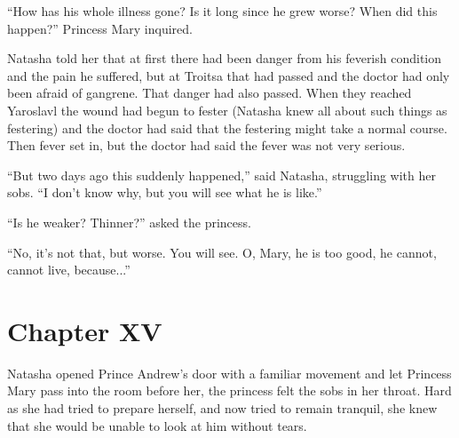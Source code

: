 ``How has his whole illness gone? Is it long since he grew worse?
When did this happen?'' Princess Mary inquired.

Natasha told her that at first there had been danger from his
feverish condition and the pain he suffered, but at Troitsa that
had passed and the doctor had only been afraid of gangrene. That
danger had also passed. When they reached Yaroslavl the wound had
begun to fester (Natasha knew all about such things as festering)
and the doctor had said that the festering might take a normal
course. Then fever set in, but the doctor had said the fever was
not very serious.

``But two days ago this suddenly happened,'' said Natasha,
struggling with her sobs. ``I don't know why, but you will see
what he is like.''

``Is he weaker? Thinner?'' asked the princess.

``No, it's not that, but worse. You will see. O, Mary, he is too
good, he cannot, cannot live, because...''


\chapter*{Chapter XV} \ifaudio {}
\fi

 Natasha opened Prince Andrew's door with a familiar movement
and let Princess Mary pass into the room before her, the princess
felt the sobs in her throat. Hard as she had tried to prepare
herself, and now tried to remain tranquil, she knew that she
would be unable to look at him without tears.

